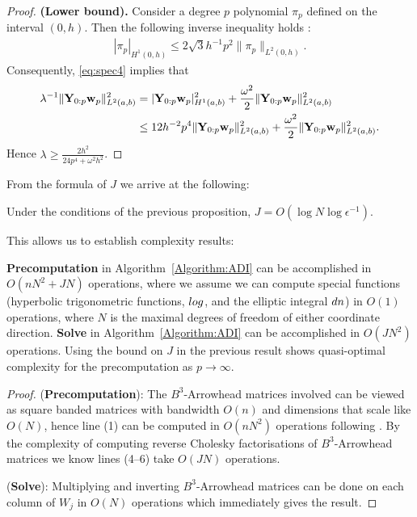 \documentclass[hidelinks,onefignum,onetabnum]{siamart220329}
\def\algref#1{Algorithm~\ref{Algorithm:#1}}
\begin{document}
\begin{proof}
\noindent \textbf{(Lower bound).} Consider a degree $p$ polynomial $\pi_p$  defined on the interval $(0,h)$. Then the following inverse inequality holds \cite[Th.~3.91]{Schwab1998}:
\begin{align}
| \pi_p |_{H^1(0,h)} \leq 2 \sqrt{3} h^{-1} p^2 \|\pi_p\|_{L^2(0,h)}.
\label{eq:spec4}
\end{align}
Consequently, \cref{eq:spec4} implies that
\begin{align}
\begin{split}
\lambda^{-1} \| {\bf Y}_{0:p} {\bf w}_p\|^2_{L^2(a,b)} 
&= | {\bf Y}_{0:p} {\bf w}_p|^2_{H^1(a,b)} + \frac{\omega^2}{2} \| {\bf Y}_{0:p} {\bf w}_p\|^2_{L^2(a,b)} \\
& \leq 12 h^{-2} p^4 \| {\bf Y}_{0:p} {\bf w}_p\|^2_{L^2(a,b)} + \frac{\omega^2}{2} \| {\bf Y}_{0:p} {\bf w}_p\|^2_{L^2(a,b)}.
\end{split}
\label{eq:spec5}
\end{align}
Hence $\lambda  \geq \frac{2 h^2}{24  p^{4} + \omega^2 h^2}$. 
\end{proof}


From the formula of $J$ we arrive at the following:

\begin{lemma}
	Under the conditions of the previous proposition, $ J  = O(\log N \log \epsilon^{-1})$.
\end{lemma}

This allows us to establish complexity results:

\begin{theorem}
	{\bf Precomputation}
	in \algref{ADI} can be accomplished in $O(n N^2 + J N)$ operations,
where we assume we can compute special functions (hyperbolic trigonometric functions, ${\rm log}$, and the elliptic integral ${\rm dn}$) in $O(1)$ operations, where $N$ is the maximal degrees of freedom of either coordinate direction. {\bf Solve} in \algref{ADI}  can be accomplished in $O(J N^2)$ operations. Using the bound on $J$ in the previous result shows quasi-optimal complexity for the precomputation as $p \rightarrow \infty$.
\end{theorem}
\begin{proof}
({\bf Precomputation}): The $B^3$-Arrowhead matrices involved can be viewed as square banded matrices with bandwidth $O(n)$ and dimensions that scale like $O(N)$, hence line (1) can be computed in $O(n N^2)$ operations following \cite{crawford1973reduction}. By the complexity of computing reverse Cholesky factorisations of $B^3$-Arrowhead matrices we know lines (4--6) take $O(J N)$ operations.

({\bf Solve}): Multiplying and inverting $B^3$-Arrowhead matrices can be done on each column of $W_j$ in $O(N)$ operations which immediately gives the result.
\end{proof}
\end{document}
